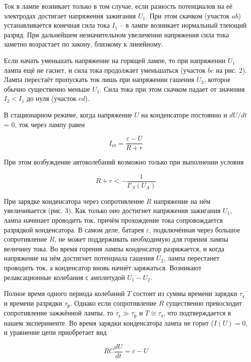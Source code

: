 Ток в лампе возникает только в том случае, если разность потенциалов на её электродах достигает напряжения зажигания $U_1$. При этом скачком (участок $ab$) устанавливается конечная сила тока $I_1$ -- в лампе возникает нормальный тлеющий разряд. При дальнейшем незначительном увеличении напряжения сила тока заметно возрастает по закону, близкому к линейному.

Если начать уменьшать напряжение на горящей лампе, то при напряжении $U_1$ лампа ещё не гаснет, и сила тока продолжает уменьшаться
(участок $bc$ на рис. 2). Лампа перестаёт пропускать ток лишь при напряжении гашения $U_2$, которое обычно существенно меньше $U_1$. Сила тока
при этом скачком падает от значения $I_2 < I_1$ до нуля (участок $cd$).

В стационарном режиме, когда напряжение $U$ на конденсаторе постоянно и $dU/dt$ = 0, ток через лампу равен

\begin{equation}
    I_{\text{ст}} = \frac{\varepsilon - U}{R + r}
\end{equation}

При этом возбуждение автоколебаний возможно только при выполнении условия

\begin{equation}
    R + r < - \frac{1}{I'_S(U_A)}
\end{equation}

При зарядке конденсатора через сопротивление $R$ напряжение на нём увеличивается (рис. 3). Как только оно достигнет напряжения зажигания $U_1$, лампа начинает проводить ток, причём прохождение тока сопровождается разрядкой конденсатора. В самом деле, батарея $\varepsilon$, подключённая
через большое сопротивление $R$, не может поддерживать необходимую для горения лампы величину тока. Во время горения лампы конденсатор разряжается, и когда напряжение на нём достигнет потенциала гашения $U_2$, лампа перестанет проводить ток, а конденсатор вновь начнёт заряжаться. Возникают релаксационные колебания с амплитудой $U_1 - U_2$.

Полное время одного периода колебаний $T$ состоит из суммы времени зарядки $\tau_{\text{з}}$ и времени разрядки $\tau_{\text{р}}$.
Однако если сопротивление $R$ существенно превосходит сопротивление
зажжённой лампы, то $ \tau_{\text{з}} \gg \tau_{\text{р}}$ и $T \cong \tau_{\text{з}}$, что подтверждается в нашем эксперименте. Во время зарядки конденсатора лампа не горит ($I(U) = 0$,
и уравнение цепи приобретает вид

\begin{equation}
    RC \frac{dU}{dt} = \varepsilon - U
\end{equation}

